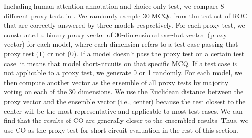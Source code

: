 Including human attention annotation and choice-only test, we compare 8 different 
proxy tests in . 
We randomly sample 30 MCQs from the test set of ROC that are correctly answered 
by three models respectively. 
For each proxy test, we constructed a binary proxy vector 
of 30-dimensional one-hot vector~(proxy vector) for each model, where each dimension refers to 
a test case passing that proxy test (1) or not (0). If a model doesn't pass the proxy test 
on a certain test case, it means that model short-circuits on that specific MCQ. 
If a test case is not applicable to a proxy test, we generate 0 or 1 randomly.
For each model, we then compute another vector as the ensemble of all proxy tests by 
majority voting on each of the 30 dimensions. We use the Euclidean distance between the 
proxy vector and the ensemble vector (i.e., center) because the test 
closest to the center will be the most 
representative and applicable to most test cases.  
We can find that the results of CO are generally closer to the ensembled results. 
Thus, we use CO as the proxy test for short circuit evaluation in the rest of
this section. 

